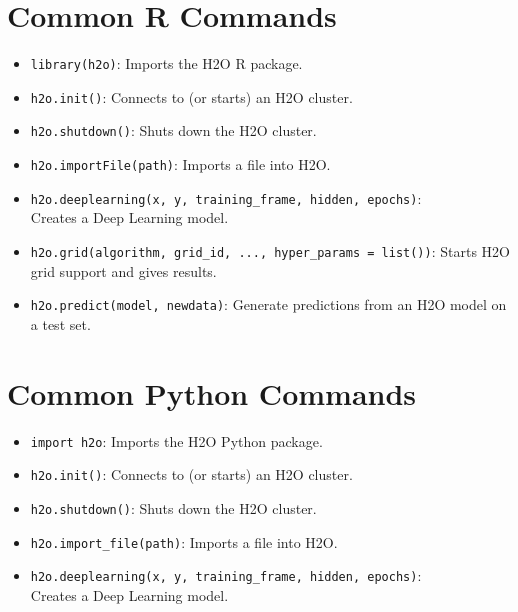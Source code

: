 {{\section{Common R Commands}
\begin{itemize}

\item \texttt{library(h2o)}: Imports the H2O R package.

\item \texttt{h2o.init()}:  Connects to (or starts) an H2O cluster.

\item \texttt{h2o.shutdown()}: Shuts down the H2O cluster.

\item \texttt{h2o.importFile(path)}: Imports a file into H2O.

\item \texttt{h2o.deeplearning(x, y, training\_frame, hidden, epochs)}:\\ Creates a Deep Learning model.

\item \texttt{h2o.grid(algorithm, grid\_id, ..., hyper\_params = list())}: Starts H2O grid support and gives results.

\item \texttt{h2o.predict(model, newdata)}: Generate predictions from an H2O model on a test set.

\end{itemize}

\newpage
\section{Common Python Commands}
\begin{itemize}
\item \texttt{import h2o}:  Imports the H2O Python package.

\item \texttt{h2o.init()}:  Connects to (or starts) an H2O cluster.

\item \texttt{h2o.shutdown()}: Shuts down the H2O cluster.

\item \texttt{h2o.import\_file(path)}: Imports a file into H2O.

\item \texttt{h2o.deeplearning(x, y, training\_frame, hidden, epochs)}: \\ Creates a Deep Learning model.


\end{itemize}}}
